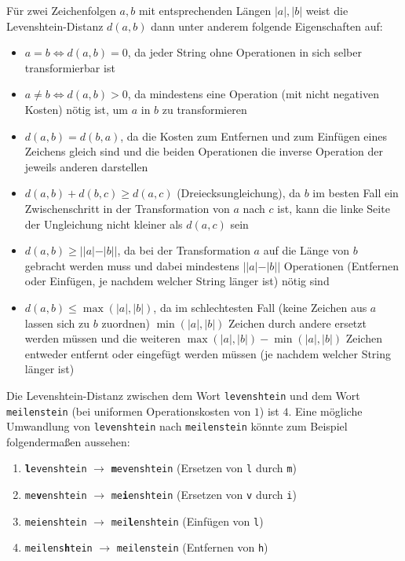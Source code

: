 \documentclass{whswinvcbook}
\begin{document}
Für zwei Zeichenfolgen $a,b$ mit entsprechenden Längen $|a|,|b|$ weist die Levenshtein-Distanz $d(a,b)$ dann unter anderem folgende Eigenschaften auf:
\begin{itemize}
    \item $a=b\Longleftrightarrow d(a,b)=0$, da jeder String ohne Operationen in sich selber transformierbar ist
    \item $a\neq b\Longleftrightarrow d(a,b)>0$, da mindestens eine Operation (mit nicht negativen Kosten) nötig ist, um $a$ in $b$ zu transformieren
    \item $d(a,b)=d(b,a)$, da die Kosten zum Entfernen und zum Einfügen eines Zeichens gleich sind und die beiden Operationen die inverse Operation der jeweils anderen darstellen
    \item $d(a,b)+d(b,c)\geq d(a,c)$ (Dreiecksungleichung), da $b$ im besten Fall ein Zwischenschritt in der Transformation von $a$ nach $c$ ist, kann die linke Seite der Ungleichung nicht kleiner als $d(a,c)$ sein
    \item $d(a,b)\geq||a|-|b||$, da bei der Transformation $a$ auf die Länge von $b$ gebracht werden muss und dabei mindestens $||a|-|b||$ Operationen (Entfernen oder Einfügen, je nachdem welcher String länger ist) nötig sind
    \item $d(a,b)\leq \max(|a|,|b|)$, da im schlechtesten Fall (keine Zeichen aus $a$ lassen sich zu $b$ zuordnen) $\min(|a|,|b|)$ Zeichen durch andere ersetzt werden müssen und die weiteren $\max(|a|,|b|)-\min(|a|,|b|)$ Zeichen entweder entfernt oder eingefügt werden müssen (je nachdem welcher String länger ist)
\end{itemize}
Die Levenshtein-Distanz zwischen dem Wort \texttt{levenshtein} und dem Wort \texttt{meilenstein} (bei uniformen Operationskosten von $1$) ist $4$. Eine mögliche Umwandlung von \texttt{levenshtein} nach \texttt{meilenstein} könnte zum Beispiel folgendermaßen aussehen:
\begin{enumerate}
    \item \texttt{\textbf{l}evenshtein} $\rightarrow$ \texttt{\textbf{m}evenshtein} (Ersetzen von \texttt{l} durch \texttt{m})
    \item \texttt{me\textbf{v}enshtein} $\rightarrow$ \texttt{me\textbf{i}enshtein} (Ersetzen von \texttt{v} durch \texttt{i})
    \item \texttt{meienshtein} $\rightarrow$ \texttt{mei\textbf{l}enshtein} (Einfügen von \texttt{l})
    \item \texttt{meilens\textbf{h}tein} $\rightarrow$ \texttt{meilenstein} (Entfernen von \texttt{h})
\end{enumerate}
\end{document}
